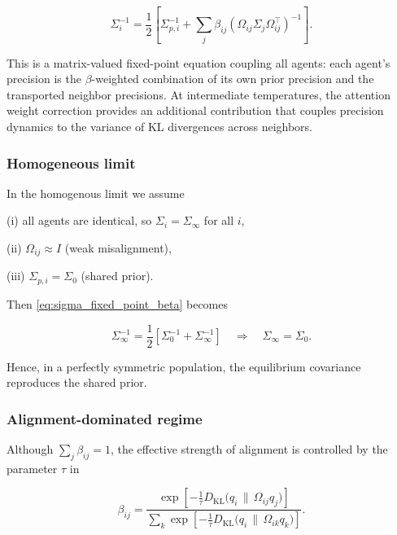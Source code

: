 \documentclass[twoside,11pt]{article}
\begin{document}
\begin{equation}
\Sigma_i^{-1}
=\frac{1}{2}
\left[
\Sigma_{p,i}^{-1}
+ \sum_j \beta_{ij}
(\Omega_{ij}\Sigma_j\Omega_{ij}^\top)^{-1}
\right].
\label{eq:sigma_fixed_point_beta}
\end{equation}

This is a matrix-valued fixed-point equation coupling all agents: each agent's precision is the $\beta$-weighted combination of its own prior precision and the transported neighbor precisions. At intermediate temperatures, the attention weight correction provides an additional contribution that couples precision dynamics to the variance of KL divergences across neighbors.

\subsubsection{Homogeneous limit}

In the homogenous limit we assume

(i) all agents are identical, so $\Sigma_i = \Sigma_\infty$ for all $i$,

(ii) $\Omega_{ij} \approx I$ (weak misalignment),

(iii) $\Sigma_{p,i} = \Sigma_0$ (shared prior).

Then \eqref{eq:sigma_fixed_point_beta} becomes

\begin{equation}
\Sigma_\infty^{-1}
=\frac{1}{2}
\left[
\Sigma_0^{-1}
+ \Sigma_\infty^{-1}
\right]
\quad\Longrightarrow\quad
\Sigma_\infty = \Sigma_0.
\end{equation}

Hence, in a perfectly symmetric population, the equilibrium covariance reproduces the shared prior.

\subsubsection{Alignment-dominated regime}

Although $\sum_j \beta_{ij} = 1$, the effective strength of alignment is controlled by the parameter $\tau$ in

\begin{equation}
\beta_{ij}
=\frac{
\exp\!\left[
-\frac{1}{\tau}
D_{\mathrm{KL}}\!\big(q_i \,\|\, \Omega_{ij} q_j\big)
\right]
}{\sum_k
\exp\!\left[
-\frac{1}{\tau}
D_{\mathrm{KL}}\!\big(q_i \,\|\, \Omega_{ik} q_k\big)
\right]}.
\end{equation}
\end{document}
